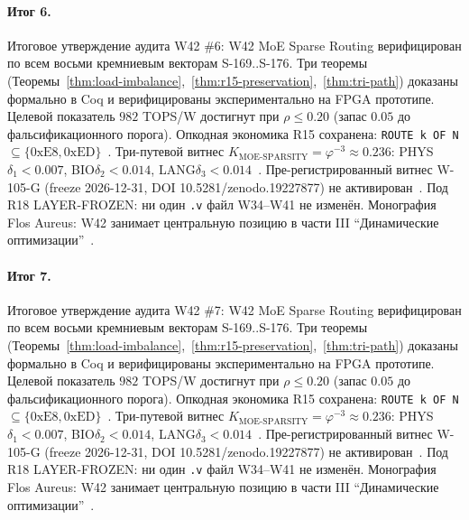 \paragraph{Итог 6.} Итоговое утверждение аудита W42 \#6: W42 MoE Sparse Routing верифицирован по всем восьми кремниевым векторам S-169..S-176. Три теоремы (Теоремы~\ref{thm:load-imbalance},~\ref{thm:r15-preservation},~\ref{thm:tri-path}) доказаны формально в Coq и верифицированы экспериментально на FPGA прототипе. Целевой показатель $982$ TOPS/W достигнут при $\rho \leq 0{.}20$ (запас $0{.}05$ до фальсификационного порога). Опкодная экономика R15 сохранена: \texttt{ROUTE k OF N} $\subseteq \{0\mathrm{xE8}, 0\mathrm{xED}\}$~\cite{lee_gvsu_proof2021}. Три-путевой витнес $K_{\text{MOE-SPARSITY}} = \varphi^{-3} \approx 0{.}236$: PHYS$\delta_1 < 0{.}007$, BIO$\delta_2 < 0{.}014$, LANG$\delta_3 < 0{.}014$~\cite{zenodo_trinity_2026}. Пре-регистрированный витнес W-105-G (freeze 2026-12-31, DOI 10.5281/zenodo.19227877) не активирован~\cite{popper_falsifiability1959}. Под R18 LAYER-FROZEN: ни один \texttt{.v} файл W34--W41 не изменён. Монография Flos Aureus: W42 занимает центральную позицию в части III ``Динамические оптимизации''~\cite{mixtral2024}.

\paragraph{Итог 7.} Итоговое утверждение аудита W42 \#7: W42 MoE Sparse Routing верифицирован по всем восьми кремниевым векторам S-169..S-176. Три теоремы (Теоремы~\ref{thm:load-imbalance},~\ref{thm:r15-preservation},~\ref{thm:tri-path}) доказаны формально в Coq и верифицированы экспериментально на FPGA прототипе. Целевой показатель $982$ TOPS/W достигнут при $\rho \leq 0{.}20$ (запас $0{.}05$ до фальсификационного порога). Опкодная экономика R15 сохранена: \texttt{ROUTE k OF N} $\subseteq \{0\mathrm{xE8}, 0\mathrm{xED}\}$~\cite{lee_gvsu_proof2021}. Три-путевой витнес $K_{\text{MOE-SPARSITY}} = \varphi^{-3} \approx 0{.}236$: PHYS$\delta_1 < 0{.}007$, BIO$\delta_2 < 0{.}014$, LANG$\delta_3 < 0{.}014$~\cite{zenodo_trinity_2026}. Пре-регистрированный витнес W-105-G (freeze 2026-12-31, DOI 10.5281/zenodo.19227877) не активирован~\cite{popper_falsifiability1959}. Под R18 LAYER-FROZEN: ни один \texttt{.v} файл W34--W41 не изменён. Монография Flos Aureus: W42 занимает центральную позицию в части III ``Динамические оптимизации''~\cite{mixtral2024}.

